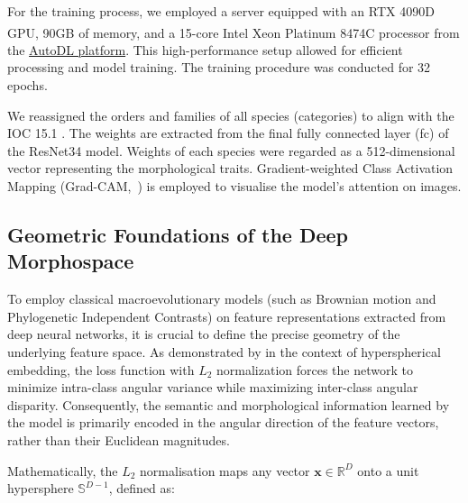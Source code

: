For the training process, we employed a server equipped with an RTX 4090D
GPU, 90GB of memory, and a 15-core
Intel\textsuperscript{\textregistered} Xeon\textsuperscript{\textregistered}
Platinum 8474C processor from the \href{https://www.autodl.com/docs/}{AutoDL platform}.
This high-performance setup allowed for efficient processing and model training.
The training procedure was conducted for 32 epochs.

We reassigned the orders and families of all species (categories) to align with the
IOC 15.1 \parencite{Gill2025IOC}. The weights are extracted from the final fully
connected layer (fc) of the ResNet34 model. Weights of each species were regarded as a
512-dimensional vector representing the morphological traits.
Gradient-weighted Class Activation Mapping (Grad-CAM,~\cite{Selvaraju2020Grad}) is
employed to visualise the model's attention on images. 


\subsection{Geometric Foundations of the Deep Morphospace}\label{subsec:mm-geometric-foundations}

To employ classical macroevolutionary models (such as Brownian motion and Phylogenetic Independent Contrasts) 
on feature representations extracted from deep neural networks, it is crucial to define the precise geometry of the underlying feature space. 
As demonstrated by \textcite{Wang2017NormFace} in the context of hyperspherical embedding, the loss function with $L_2$ normalization forces 
the network to minimize intra-class angular variance while maximizing inter-class angular disparity. 
Consequently, the semantic and morphological information learned by the model is primarily encoded in the angular direction of the feature vectors, 
rather than their Euclidean magnitudes.

Mathematically, the $L_2$ normalisation maps any vector $\mathbf{x} \in \mathbb{R}^D$ onto a unit hypersphere $\mathbb{S}^{D-1}$, defined as:

